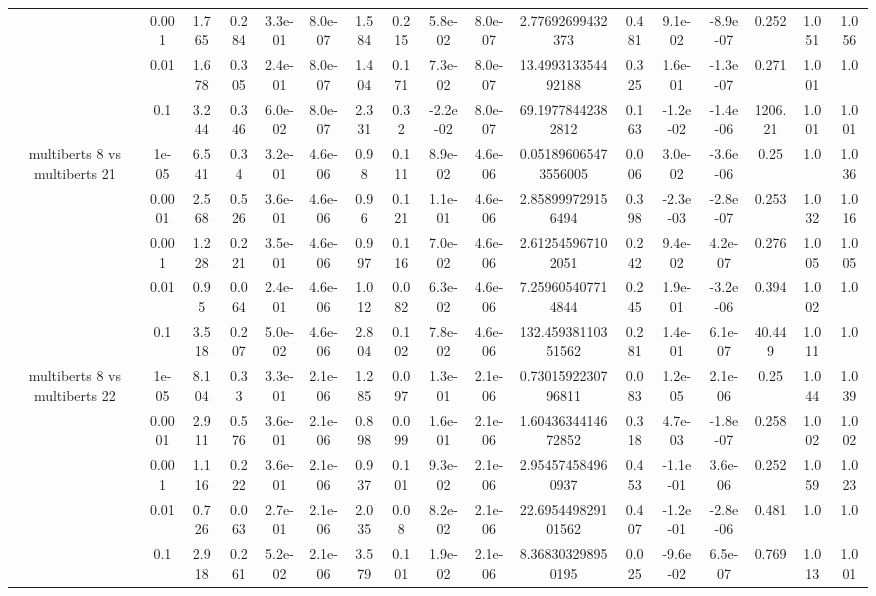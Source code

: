 \begin{tabular}{|c|c|c|c|c|c|c|c|c|c|c|c|c|c|c|c|c|}
 & 0.001 & 1.765 & 0.284 & 3.3e-01 & 8.0e-07 & 1.584 & 0.215 & 5.8e-02 & 8.0e-07 & 2.77692699432373 & 0.481 & 9.1e-02 & -8.9e-07 & 0.252 & 1.051 & 1.056 \\
 & 0.01 & 1.678 & 0.305 & 2.4e-01 & 8.0e-07 & 1.404 & 0.171 & 7.3e-02 & 8.0e-07 & 13.499313354492188 & 0.325 & 1.6e-01 & -1.3e-07 & 0.271 & 1.001 & 1.0 \\
 & 0.1 & 3.244 & 0.346 & 6.0e-02 & 8.0e-07 & 2.331 & 0.32 & -2.2e-02 & 8.0e-07 & 69.19778442382812 & 0.163 & -1.2e-02 & -1.4e-06 & 1206.21 & 1.001 & 1.001 \\
\hline
\multirow{5}{*}{multiberts 8 vs multiberts 21} & 1e-05 & 6.541 & 0.34 & 3.2e-01 & 4.6e-06 & 0.98 & 0.111 & 8.9e-02 & 4.6e-06 & 0.051896065473556005 & 0.006 & 3.0e-02 & -3.6e-06 & 0.25 & 1.0 & 1.036 \\
 & 0.0001 & 2.568 & 0.526 & 3.6e-01 & 4.6e-06 & 0.96 & 0.121 & 1.1e-01 & 4.6e-06 & 2.858999729156494 & 0.398 & -2.3e-03 & -2.8e-07 & 0.253 & 1.032 & 1.016 \\
 & 0.001 & 1.228 & 0.221 & 3.5e-01 & 4.6e-06 & 0.997 & 0.116 & 7.0e-02 & 4.6e-06 & 2.612545967102051 & 0.242 & 9.4e-02 & 4.2e-07 & 0.276 & 1.005 & 1.005 \\
 & 0.01 & 0.95 & 0.064 & 2.4e-01 & 4.6e-06 & 1.012 & 0.082 & 6.3e-02 & 4.6e-06 & 7.259605407714844 & 0.245 & 1.9e-01 & -3.2e-06 & 0.394 & 1.002 & 1.0 \\
 & 0.1 & 3.518 & 0.207 & 5.0e-02 & 4.6e-06 & 2.804 & 0.102 & 7.8e-02 & 4.6e-06 & 132.45938110351562 & 0.281 & 1.4e-01 & 6.1e-07 & 40.449 & 1.011 & 1.0 \\
\hline
\multirow{5}{*}{multiberts 8 vs multiberts 22} & 1e-05 & 8.104 & 0.33 & 3.3e-01 & 2.1e-06 & 1.285 & 0.097 & 1.3e-01 & 2.1e-06 & 0.7301592230796811 & 0.083 & 1.2e-05 & 2.1e-06 & 0.25 & 1.044 & 1.039 \\
 & 0.0001 & 2.911 & 0.576 & 3.6e-01 & 2.1e-06 & 0.898 & 0.099 & 1.6e-01 & 2.1e-06 & 1.6043634414672852 & 0.318 & 4.7e-03 & -1.8e-07 & 0.258 & 1.002 & 1.002 \\
 & 0.001 & 1.116 & 0.222 & 3.6e-01 & 2.1e-06 & 0.937 & 0.101 & 9.3e-02 & 2.1e-06 & 2.954574584960937 & 0.453 & -1.1e-01 & 3.6e-06 & 0.252 & 1.059 & 1.023 \\
 & 0.01 & 0.726 & 0.063 & 2.7e-01 & 2.1e-06 & 2.035 & 0.08 & 8.2e-02 & 2.1e-06 & 22.695449829101562 & 0.407 & -1.2e-01 & -2.8e-06 & 0.481 & 1.0 & 1.0 \\
 & 0.1 & 2.918 & 0.261 & 5.2e-02 & 2.1e-06 & 3.579 & 0.101 & 1.9e-02 & 2.1e-06 & 8.368303298950195 & 0.025 & -9.6e-02 & 6.5e-07 & 0.769 & 1.013 & 1.001 \\

\end{tabular}
